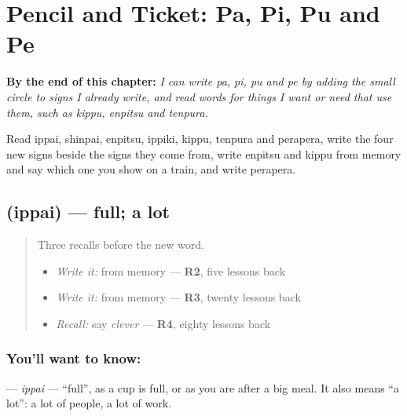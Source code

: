 
\chapter{Pencil and Ticket: Pa, Pi, Pu and Pe}
\label{ch:ja-pencil-and-ticket-pa-pi-pu-pe}

\begin{chapteropening}
\textbf{By the end of this chapter:} \emph{I can write pa, pi, pu and pe by adding the small circle to signs I already write, and read words for things I want or need that use them, such as kippu, enpitsu and tenpura.}

Read ippai, shinpai, enpitsu, ippiki, kippu, tenpura and perapera, write the four new signs beside the signs they come from, write enpitsu and kippu from memory and say which one you show on a train, and write perapera.
\end{chapteropening}

\section[\texorpdfstring{\ja{いっぱい} (ippai)}{いっぱい (ippai)}]{ (ippai) — full; a lot}

\label{lesson:JA-C137-ippai}



\begin{quote}
Three recalls before the new word.

\begin{itemize}
\raggedright
  \item \emph{Write it:} \textbf{} from memory — \textbf{R2}, five lessons back
  \item \emph{Write it:} \textbf{} from memory — \textbf{R3}, twenty lessons back
  \item \emph{Recall:} say \emph{clever} — \textbf{R4}, eighty lessons back
\end{itemize}
\end{quote}

\subsection*{You'll want to know: }
\textbf{} — \emph{ippai} — \textquotedblleft{}full\textquotedblright{}, as a cup is full, or as you are after a big meal. It also means \textquotedblleft{}a lot\textquotedblright{}: a lot of people, a lot of work.

